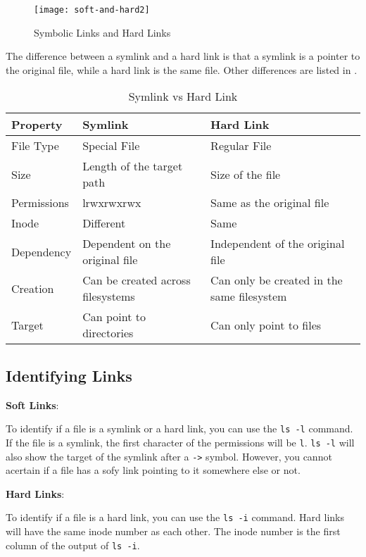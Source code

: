 \begin{figure}[hb]
  \texttt{[image: soft-and-hard2]}
  \caption[Symbolic Links and Hard Links]{Symbolic Links and Hard Links}
\end{figure}

The difference between a symlink and a hard link is that a symlink is a pointer to the original file, while a hard link is the same file.
Other differences are listed in .

\begin{table*}[hb]
\caption{Symlink vs Hard Link}
\begin{tabular}{ l l l }
  \toprule
  Property & Symlink & Hard Link \\
 \midrule
  File Type & Special File & Regular File \\
  Size & Length of the target path & Size of the file \\
  Permissions & lrwxrwxrwx & Same as the original file \\
  Inode & Different & Same \\
  Dependency & Dependent on the original file & Independent of the original file \\
  Creation & Can be created across filesystems & Can only be created in the same filesystem \\
  Target & Can point to directories & Can only point to files \\
 \bottomrule
 \end{tabular}
\end{table*}

\subsection{Identifying Links}

\textbf{Soft Links}:

To identify if a file is a symlink or a hard link, you can use the \texttt{ls -l} command.
If the file is a symlink, the first character of the permissions will be \texttt{l}.
\texttt{ls -l} will also show the target of the symlink after a \texttt{->} symbol.
However, you cannot acertain if a file has a sofy link pointing to it somewhere else or not.

\textbf{Hard Links}:

To identify if a file is a hard link, you can use the \texttt{ls -i} command.
Hard links will have the same inode number as each other.
The inode number is the first column of the output of \texttt{ls -i}.

